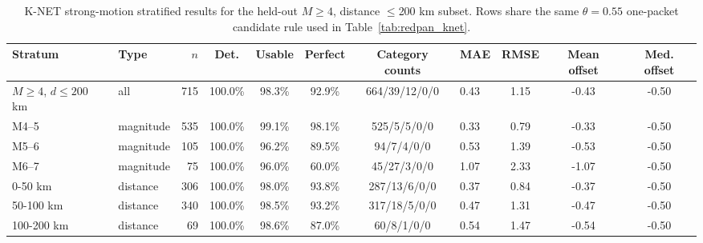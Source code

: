 \begin{table}[!t]
\centering
\caption{K-NET strong-motion stratified results for the held-out $M\geq4$, distance $\leq$200 km subset. Rows share the same $\theta=0.55$ one-packet candidate rule used in Table~\ref{tab:redpan_knet}.}
\label{tab:knet_stratified_detailed}
{\tgrsdensetablesetup
\begin{tabular}{@{}llrcccclccc@{}}
\toprule
Stratum & Type & $n$ & Det. & Usable & Perfect & Category counts & MAE & RMSE & Mean offset & Med. offset\\
\midrule
$M\geq4$, $d\leq200$ km & all & 715 & 100.0\% & 98.3\% & 92.9\% & 664/39/12/0/0 & 0.43 & 1.15 & -0.43 & -0.50\\
M4--5 & magnitude & 535 & 100.0\% & 99.1\% & 98.1\% & 525/5/5/0/0 & 0.33 & 0.79 & -0.33 & -0.50\\
M5--6 & magnitude & 105 & 100.0\% & 96.2\% & 89.5\% & 94/7/4/0/0 & 0.53 & 1.39 & -0.53 & -0.50\\
M6--7 & magnitude & 75 & 100.0\% & 96.0\% & 60.0\% & 45/27/3/0/0 & 1.07 & 2.33 & -1.07 & -0.50\\
0-50 km & distance & 306 & 100.0\% & 98.0\% & 93.8\% & 287/13/6/0/0 & 0.37 & 0.84 & -0.37 & -0.50\\
50-100 km & distance & 340 & 100.0\% & 98.5\% & 93.2\% & 317/18/5/0/0 & 0.47 & 1.31 & -0.47 & -0.50\\
100-200 km & distance & 69 & 100.0\% & 98.6\% & 87.0\% & 60/8/1/0/0 & 0.54 & 1.47 & -0.54 & -0.50\\
\bottomrule
\end{tabular}}
\end{table}

